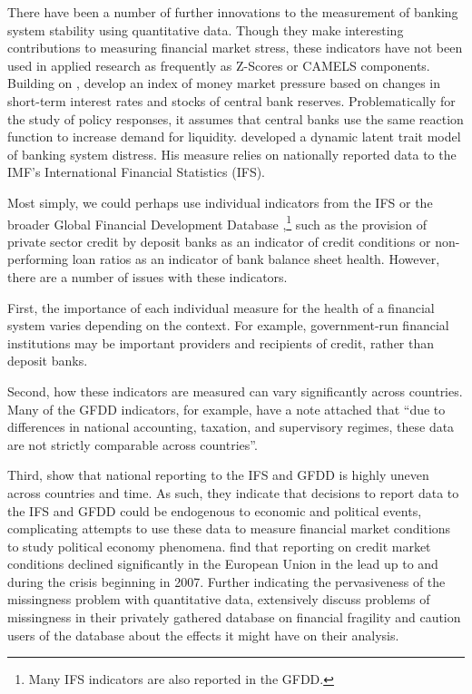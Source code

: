 \documentclass[]{article}
\begin{document}
There have been a number of further innovations to the measurement of banking system stability using quantitative data. Though they make interesting contributions to measuring financial market stress, these indicators have not been used in applied research as frequently as Z-Scores or CAMELS components. Building on \cite{vonHagen2007}, \cite{Jing2015} develop an index of money market pressure based on changes in short-term interest rates and stocks of central bank reserves. Problematically for the study of policy responses, it assumes that central banks use the same reaction function to increase demand for liquidity. \cite{Rosas2009dltm} developed a dynamic latent trait model of banking system distress. His measure relies on nationally reported data to the IMF's International Financial Statistics (IFS).

Most simply, we could perhaps use individual indicators from the IFS or the broader Global Financial Development Database \citep[GFDD,][]{worldbank2015},\footnote{Many IFS indicators are also reported in the GFDD.} such as the provision of private sector credit by deposit banks as an indicator of credit conditions or non-performing loan ratios as an indicator of bank balance sheet health. However, there are a number of issues with these indicators.

First, the importance of each individual measure for the health of a financial system varies depending on the context. For example, government-run financial institutions may be important providers and recipients of credit, rather than deposit banks.

Second, how these indicators are measured can vary significantly across countries. Many of the GFDD indicators, for example, have a note attached that ``due to differences in national accounting, taxation, and supervisory regimes, these data are not strictly comparable across countries''.

Third, \cite{GandrudCopHal2015} show that national reporting to the IFS and GFDD is highly uneven across countries and time. As such, they indicate that decisions to report data to the IFS and GFDD could be endogenous to economic and political events, complicating attempts to use these data to measure financial market conditions to study political economy phenomena. \cite{cghBruegel2015} find that reporting on credit market conditions declined significantly in the European Union in the lead up to and during the crisis beginning in 2007. Further indicating the pervasiveness of the missingness problem with quantitative data, \cite{Andrianova2015} extensively discuss problems of missingness in their privately gathered database on financial fragility and caution users of the database about the effects it might have on their analysis.
\end{document}
